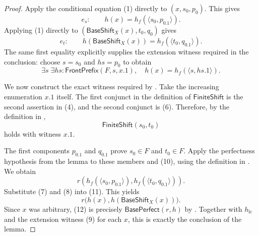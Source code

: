 \begin{proof}
Apply the conditional equation (1) directly to $(x,s_0,p_0)$.  This
gives
\[
 e_s:\qquad h(x)=h_f\!\left(\langle s_0,p_0.1\rangle\right).
\tag{7}
\]
Applying (1) directly to
$(\mathsf{BaseShift}_X(x),t_0,q_0)$ gives
\[
 e_t:\qquad h(\mathsf{BaseShift}_X(x))
   =h_f\!\left(\langle t_0,q_0.1\rangle\right).
\tag{8}
\]
The same first equality explicitly supplies the extension witness required
in the conclusion: choose $s=s_0$ and $hs=p_0$ to obtain
\[
 \exists s\;\exists hs:\mathsf{FrontPrefix}(F,s,x.1),\quad
 h(x)=h_f\!\left(\langle s,hs.1\rangle\right).
\tag{9}
\]

We now construct the exact witness required by
.  Take the increasing enumeration $x.1$ itself.
The first conjunct in the definition of $\mathsf{FiniteShift}$ is the
second assertion in (4), and the second conjunct is (6).  Therefore, by
the definition in ,
\[
 \mathsf{FiniteShift}(s_0,t_0)                                  \tag{10}
\]
holds with witness $x.1$.

The first components $p_0.1$ and $q_0.1$ prove $s_0\in F$ and $t_0\in F$.
Apply the perfectness hypothesis from the lemma to these members and
(10), using the definition in
.  We obtain
\[
 r\!\left(h_f\!\left(\langle s_0,p_0.1\rangle\right),
          h_f\!\left(\langle t_0,q_0.1\rangle\right)\right).       \tag{11}
\]
Substitute (7) and (8) into (11).  This yields
\[
 r\bigl(h(x),h(\mathsf{BaseShift}_X(x))\bigr).                    \tag{12}
\]
Since $x$ was arbitrary, (12) is precisely
$\mathsf{BasePerfect}(r,h)$ by .  Together with
$h_{\mathrm{lc}}$ and the extension witness (9) for each $x$, this is
exactly the conclusion of the lemma.
\end{proof}
